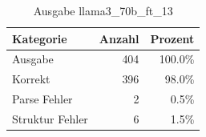 
\begin{table}[!ht]
\centering
\begin{tabular}{lrr}
\toprule
\textbf{Kategorie} & \textbf{Anzahl} & \textbf{Prozent} \\
\midrule
Ausgabe & 404 & 100.0\% \\
Korrekt & 396 & 98.0\% \\
Parse Fehler & 2 & 0.5\% \\
Struktur Fehler & 6 & 1.5\% \\
\bottomrule
\end{tabular}
\caption{Ausgabe llama3_70b_ft_13}
\label{tab:file_counts}
\end{table}
    